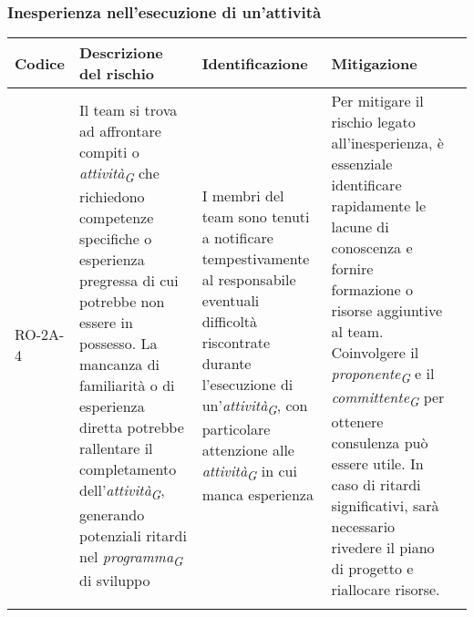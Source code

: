 \subsubsection{Inesperienza nell'esecuzione di un'attività} \label{sec:inexpAttività}
\begin{table}[H]
    \centering
    \begin{tabularx}{\textwidth}{l>{\RaggedRight}X>{\RaggedRight}X>{\RaggedRight}X>{\RaggedRight}X}
    \toprule
    \rowcolor{gray!50}
    \textbf{Codice} & \textbf{Descrizione del rischio} & \textbf{Identificazione} & \textbf{Mitigazione} \\
    \midrule
    \addlinespace 
    RO-2A-4 & 
    Il team si trova ad affrontare compiti o \textit{attività}\textsubscript{\textit{G}} che richiedono competenze specifiche o esperienza pregressa di cui potrebbe non essere in possesso. La mancanza di familiarità o di esperienza diretta potrebbe rallentare il completamento dell'\textit{attività}\textsubscript{\textit{G}}, generando potenziali ritardi nel \textit{programma}\textsubscript{\textit{G}} di sviluppo &
    I membri del team sono tenuti a notificare tempestivamente al responsabile eventuali difficoltà riscontrate durante l'esecuzione di un'\textit{attività}\textsubscript{\textit{G}}, con particolare attenzione alle \textit{attività}\textsubscript{\textit{G}} in cui manca esperienza &
    Per mitigare il rischio legato all'inesperienza, è essenziale identificare rapidamente le lacune di conoscenza e fornire formazione o risorse aggiuntive al team. Coinvolgere il \textit{proponente}\textsubscript{\textit{G}} e il \textit{committente}\textsubscript{\textit{G}} per ottenere consulenza può essere utile. In caso di ritardi significativi, sarà necessario rivedere il piano di progetto e riallocare risorse.\\
    \bottomrule
    \addlinespace 
    \end{tabularx}
\end{table}

